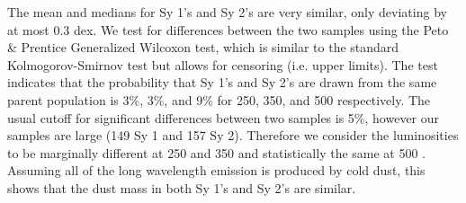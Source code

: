 The mean and medians for Sy 1's and Sy 2's are very similar, only deviating by at most 0.3 dex. We test for differences between the two samples using the Peto \& Prentice Generalized Wilcoxon test, which is similar to the standard Kolmogorov-Smirnov test but allows for censoring (i.e. upper limits). The test indicates that the probability that Sy 1's and Sy 2's are drawn from the same parent population is 3\%, 3\%, and 9\% for 250, 350, and 500 \um{} respectively. The usual cutoff for significant differences between two samples is 5\%, however our samples are large (149 Sy 1 and 157 Sy 2). Therefore we consider the luminosities to be marginally different at 250 and 350 \um{} and statistically the same at 500 \um. Assuming all of the long wavelength emission is produced by cold dust, this shows that the dust mass in both Sy 1's and Sy 2's are similar. 